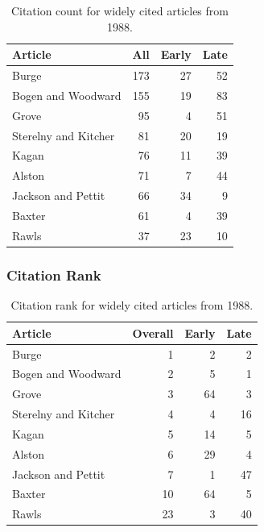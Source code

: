 \documentclass[
  10pt,
  letterpaper,
  DIV=11,
  numbers=noendperiod,
  twoside]{scrartcl}
\begin{document}
\begin{longtable}[]{@{}lrrr@{}}

\caption{\label{tbl-citation-count-1988}Citation count for widely cited
articles from 1988.}

\tabularnewline

\toprule\noalign{}
Article & All & Early & Late \\
\midrule\noalign{}
\endhead
\bottomrule\noalign{}
\endlastfoot
Burge & 173 & 27 & 52 \\
Bogen and Woodward & 155 & 19 & 83 \\
Grove & 95 & 4 & 51 \\
Sterelny and Kitcher & 81 & 20 & 19 \\
Kagan & 76 & 11 & 39 \\
Alston & 71 & 7 & 44 \\
Jackson and Pettit & 66 & 34 & 9 \\
Baxter & 61 & 4 & 39 \\
Rawls & 37 & 23 & 10 \\

\end{longtable}

\subsubsection*{Citation Rank}\label{citation-rank-12}

\begin{longtable}[]{@{}lrrr@{}}

\caption{\label{tbl-citation-rank-1988}Citation rank for widely cited
articles from 1988.}

\tabularnewline

\toprule\noalign{}
Article & Overall & Early & Late \\
\midrule\noalign{}
\endhead
\bottomrule\noalign{}
\endlastfoot
Burge & 1 & 2 & 2 \\
Bogen and Woodward & 2 & 5 & 1 \\
Grove & 3 & 64 & 3 \\
Sterelny and Kitcher & 4 & 4 & 16 \\
Kagan & 5 & 14 & 5 \\
Alston & 6 & 29 & 4 \\
Jackson and Pettit & 7 & 1 & 47 \\
Baxter & 10 & 64 & 5 \\
Rawls & 23 & 3 & 40 \\

\end{longtable}
\end{document}
